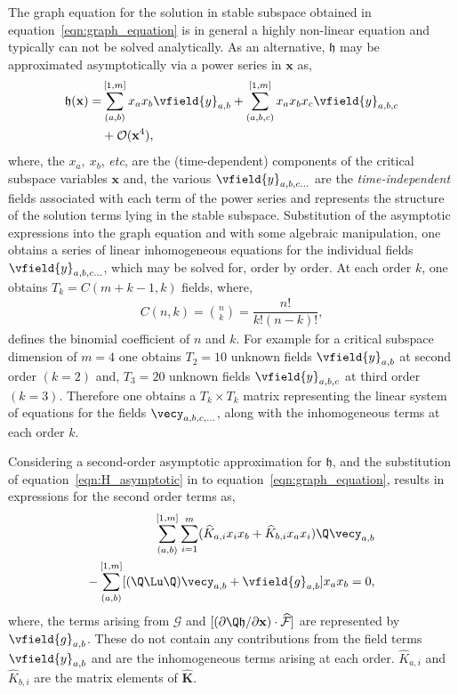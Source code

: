 The graph equation for the solution in stable subspace obtained in equation~\eqref{eqn:graph_equation} is in general a highly non-linear equation and typically can not be solved analytically. As an alternative, $\mathfrak{h}$ may be approximated asymptotically via a power series in $\mathbf{x}$ as, 
\begin{align}
	\label{eqn:H_asymptotic}
	\begin{split}
	\mathfrak{h}(\mathbf{x}) =& \sum_{(a,b)}^{[1,m]} x_{a}x_{b}\vfield{y}_{a,b} +
	\sum_{(a,b,c)}^{[1,m]} x_{a}x_{b}x_{c}\vfield{y}_{a,b,c} \\
	& + \mathcal{O}(\mathbf{x}^{4}),
\end{split}
\end{align}
where, the $x_{a},\ x_{b}$, \textit{etc}, are the (time-dependent) components of the critical subspace variables $\mathbf{x}$ and, the various $\vfield{y}_{a,b,c\ldots}$ are the \emph{time-independent} fields associated with each term of the power series and represents the structure of the solution terms lying in the stable subspace. Substitution of the asymptotic expressions into the graph equation and with some algebraic manipulation, one obtains a series of linear inhomogeneous equations for the individual fields $\vfield{y}_{a,b,c\ldots}$, which may be solved for, order by order. At each order $k$, one obtains $T_{k} = C(m+k-1,k)$ fields, where, 
\begin{align}
	\label{eqn:binomial}
	C(n,k) = \binom{n}{k} = \dfrac{n!}{k! (n-k)!},
\end{align}
defines the binomial coefficient of $n$ and $k$. For example for a critical subspace dimension of $m=4$ one obtains $T_{2} = 10$ unknown fields $\vfield{y}_{a,b}$ at second order $(k=2)$ and, $T_{3} = 20$ unknown fields $\vfield{y}_{a,b,c}$ at third order $(k=3)$. Therefore one obtains a $T_{k}\times T_{k}$ matrix representing the linear system of equations for the fields $\vecy_{a,b,c,\ldots}$, along with the inhomogeneous terms at each order $k$. 

Considering a second-order asymptotic approximation for $\mathfrak{h}$, and the substitution of equation~\eqref{eqn:H_asymptotic} in to equation~\eqref{eqn:graph_equation}, results in expressions for the second order terms as,
\begin{align}
	\begin{split}
	\sum_{(a,b)}^{[1,m]}\sum_{i=1}^{m}(\widehat{K}_{a,i}x_{i}x_{b} + \widehat{K}_{b,i}x_{a}x_{i})\Q\vecy_{a,b} \\
	- \sum_{(a,b)}^{[1,m]}[(\Q\Lu\Q)\vecy_{a,b} + \vfield{g}_{a,b}]x_{a}x_{b} = 0,
	\end{split}
\end{align}
where, the terms arising from $\mathcal{G}$ and $[(\partial \Q\mathfrak{h}/\partial \mathbf{x})\cdot \mathcal{\widehat{F}}]$ are represented by $\vfield{g}_{a,b}$. These do not contain any contributions from the field terms $\vfield{y}_{a,b}$ and are the inhomogeneous terms arising at each order.  $\widehat{K}_{a,i}$ and $\widehat{K}_{b,i}$ are the matrix elements of $\mathbf{\widehat{K}}$. 

